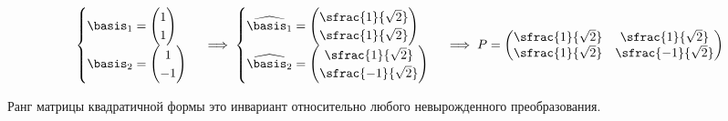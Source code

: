 \begin{align*}
  \begin{cases}
    \basis_{1} = \begin{pmatrix} 1 \\ 1 \end{pmatrix} \\
    \basis_{2} = \begin{pmatrix} 1 \\ -1 \end{pmatrix}
  \end{cases}
  \implies
  \begin{cases}
    \widehat{\basis_{1}} = \begin{pmatrix}
      \sfrac{1}{\sqrt{2}} \\
      \sfrac{1}{\sqrt{2}}
    \end{pmatrix}
    \\
    \widehat{\basis_{2}} = \begin{pmatrix}
      \sfrac{1}{\sqrt{2}} \\
      \sfrac{-1}{\sqrt{2}}
    \end{pmatrix}
  \end{cases}
  \implies
  P = \begin{pmatrix}
    \sfrac{1}{\sqrt{2}} & \sfrac{1}{\sqrt{2}} \\
    \sfrac{1}{\sqrt{2}} & \sfrac{-1}{\sqrt{2}} \\
  \end{pmatrix}
\end{align*}

\begin{remark}
  Ранг матрицы квадратичной формы это инвариант относительно любого
  невырожденного преобразования.
\end{remark}
